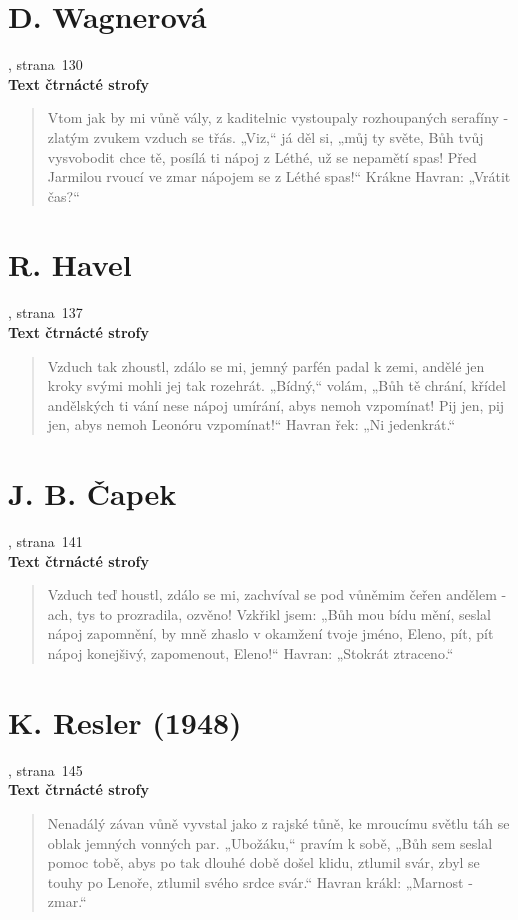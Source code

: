 \documentclass[dp.tex]{subfiles}
\begin{document}
\section*{D. Wagnerová}
, strana~130
\\\textbf{Text čtrnácté strofy}
\begin{verse}
Vtom jak by mi vůně vály,
z kaditelnic vystoupaly
rozhoupaných serafíny -
zlatým zvukem vzduch se třás.
„Viz,“ já děl si, „můj ty světe,
Bůh tvůj vysvobodit chce tě,
posílá ti nápoj z Léthé,
už se nepamětí spas!
Před Jarmilou rvoucí ve zmar
nápojem se z Léthé spas!“
Krákne Havran: „Vrátit čas?“
\end{verse}

\section*{R. Havel}
, strana~137
\\\textbf{Text čtrnácté strofy}
\begin{verse}
Vzduch tak zhoustl, zdálo se mi, jemný parfén padal k zemi,
andělé jen kroky svými mohli jej tak rozehrát.
„Bídný,“ volám, „Bůh tě chrání, křídel andělských ti vání
nese nápoj umírání, abys nemoh vzpomínat!
Pij jen, pij jen, abys nemoh Leonóru vzpomínat!“
Havran řek: „Ni jedenkrát.“
\end{verse}

\section*{J. B. Čapek}
, strana~141
\\\textbf{Text čtrnácté strofy}
\begin{verse}
Vzduch teď houstl, zdálo se mi, zachvíval se pod vůněmim
čeřen andělem - ach, tys to prozradila, ozvěno!
Vzkřikl jsem: „Bůh mou bídu mění, seslal nápoj zapomnění,
by mně zhaslo v okamžení tvoje jméno, Eleno,
pít, pít nápoj konejšivý, zapomenout, Eleno!“
Havran: „Stokrát ztraceno.“
\end{verse}

\section*{K. Resler (1948)}
, strana~145
\\\textbf{Text čtrnácté strofy}
\begin{verse}
Nenadálý závan vůně vyvstal jako z rajské tůně,
ke mroucímu světlu táh se oblak jemných vonných par.
„Ubožáku,“ pravím k sobě, „Bůh sem seslal pomoc tobě,
abys po tak dlouhé době došel klidu, ztlumil svár,
zbyl se touhy po Lenoře, ztlumil svého srdce svár.“
Havran krákl: „Marnost - zmar.“
\end{verse}
\end{document}
